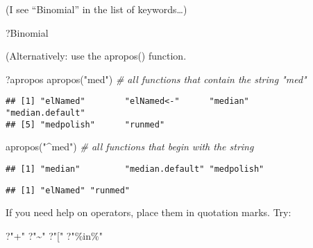 \documentclass[
]{book}
\newenvironment{Shaded}{\begin{snugshade}}{\end{snugshade}}
\newcommand{\CommentTok}[1]{\textcolor[rgb]{0.56,0.35,0.01}{\textit{#1}}}
\newcommand{\FunctionTok}[1]{\textcolor[rgb]{0.00,0.00,0.00}{#1}}
\newcommand{\NormalTok}[1]{#1}
\newcommand{\StringTok}[1]{\textcolor[rgb]{0.31,0.60,0.02}{#1}}
\begin{document}
(I see ``Binomial'' in the list of keywords\ldots)

\begin{Shaded}
\begin{Highlighting}[]
\NormalTok{?Binomial}
\end{Highlighting}
\end{Shaded}

(Alternatively: use the apropos() function.

\begin{Shaded}
\begin{Highlighting}[]
\NormalTok{?apropos}
\FunctionTok{apropos}\NormalTok{(}\StringTok{"med"}\NormalTok{)   }\CommentTok{\# all functions that contain the string "med"}
\end{Highlighting}
\end{Shaded}

\begin{verbatim}
## [1] "elNamed"        "elNamed<-"      "median"         "median.default"
## [5] "medpolish"      "runmed"
\end{verbatim}

\begin{Shaded}
\begin{Highlighting}[]
\FunctionTok{apropos}\NormalTok{(}\StringTok{"\^{}med"}\NormalTok{)  }\CommentTok{\# all functions that begin with the string}
\end{Highlighting}
\end{Shaded}

\begin{verbatim}
## [1] "median"         "median.default" "medpolish"
\end{verbatim}

\begin{Shaded}
\end{Shaded}

\begin{verbatim}
## [1] "elNamed" "runmed"
\end{verbatim}

If you need help on operators, place them in quotation marks. Try:

\begin{Shaded}
\begin{Highlighting}[]
\NormalTok{?}\StringTok{"+"}
\NormalTok{?}\StringTok{"\textasciitilde{}"}
\NormalTok{?}\StringTok{"["}
\NormalTok{?}\StringTok{"\%in\%"}
\end{Highlighting}
\end{Shaded}
\end{document}
